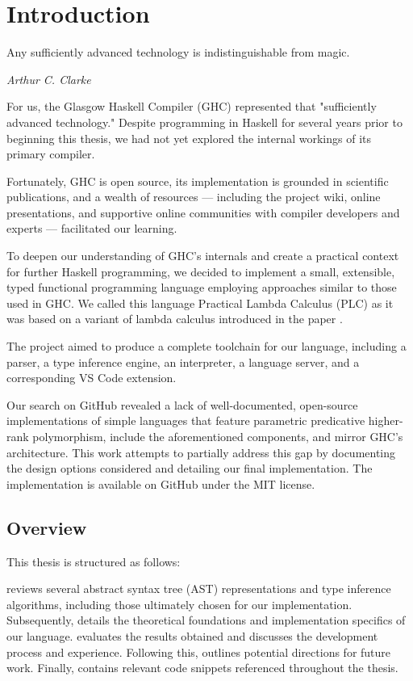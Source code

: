 \chapter{Introduction}
\label{chap:Introduction}

\epigraph{Any sufficiently advanced technology is indistinguishable from magic.}{\textit{Arthur C. Clarke}}

For us, the Glasgow Haskell Compiler (GHC) \cite{ghc-site-2025} represented that "sufficiently advanced technology."
Despite programming in Haskell for several years prior to beginning this thesis, we had not yet explored the internal workings of its primary compiler.

Fortunately, GHC is open source, its implementation is grounded in scientific publications, and a wealth of resources --- including the project wiki, online presentations, and supportive online communities with compiler developers and experts --- facilitated our learning.

To deepen our understanding of GHC's internals and create a practical context for further Haskell programming, we decided to implement a small, extensible, typed functional programming language employing approaches similar to those used in GHC. We called this language Practical Lambda Calculus (PLC) as it was based on a variant of lambda calculus introduced in the paper  \cite{jones-practical-2007}.

The project aimed to produce a complete toolchain for our language, including a parser, a type inference engine, an interpreter, a language server, and a corresponding VS Code extension.

Our search on GitHub revealed a lack of well-documented, open-source implementations of simple languages that feature parametric predicative higher-rank polymorphism, include the aforementioned components, and mirror GHC's architecture. This work attempts to partially address this gap by documenting the design options considered and detailing our final implementation. The implementation \cite{deemp-higher-rank-free-foil} is available on GitHub under the MIT license.

\section{Overview}

This thesis is structured as follows:

 reviews several abstract syntax tree (AST) representations and type inference algorithms, including those ultimately chosen for our implementation.
Subsequently,  details the theoretical foundations and implementation specifics of our language.
 evaluates the results obtained and discusses the development process and experience.
Following this,  outlines potential directions for future work.
Finally,  contains relevant code snippets referenced throughout the thesis.
